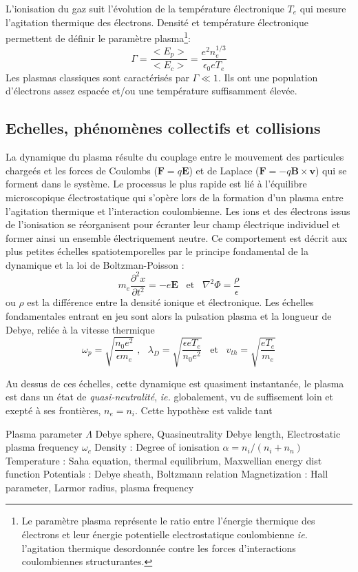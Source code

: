 			L'ionisation du gaz suit l'évolution de la température électronique $T_e$ qui
			mesure l'agitation thermique des électrons. Densité et température
			électronique permettent de définir le paramètre plasma\footnote{Le
			paramètre plasma représente le ratio entre l'énergie thermique des électrons
			et leur énergie potentielle electrostatique coulombienne \emph{ie.}
			l'agitation thermique desordonnée contre les forces d'interactions
			coulombiennes structurantes.}:
				$$\Gamma=\frac{<E_p>}{<E_c>}=\frac{e^2n_e^{1/3}}{\epsilon_0 eT_e}$$
			Les plasmas classiques sont caractérisés par $\Gamma\ll 1$. Ils ont une
			population d'électrons assez espacée et/ou une température suffisamment élevée. 
			
		\subsection{Echelles, phénomènes collectifs et collisions}
		La dynamique du plasma résulte du couplage entre le mouvement des particules chargeés et les forces 
		de Coulombs ($\mathbf F=q\mathbf E$) et de Laplace ($\mathbf F=-q\mathbf
			B\times\mathbf v$) qui se forment dans le système. Le processus le plus rapide est lié à l'équilibre
			microscopique électrostatique qui s'opère lors de la formation d'un plasma entre l'agitation thermique et 
			l'interaction coulombienne. Les ions et des électrons
			issus de l'ionisation se réorganisent pour écranter leur champ
			électrique individuel et former ainsi un ensemble électriquement neutre. 
			Ce comportement est décrit aux plus petites échelles spatiotemporelles par le principe fondamental de 
			la dynamique et la loi de Boltzman-Poisson :
			$$m_e\frac{\partial^2 x}{\partial t^2}=-e\mathbf E \;\;\;\text{et}\;\;\;\nabla^2\Phi=\frac{\rho}{\epsilon}$$ 
			ou $\rho$ est la différence entre la densité ionique et électronique.
			Les échelles fondamentales entrant en jeu sont alors la pulsation plasma et la longueur de Debye, 
			reliée à la vitesse thermique 
			$$\omega_p=\sqrt{\frac{n_0e^2}{\epsilon m_e}}\;\text{,}\;\;\;\lambda_D=\sqrt{\frac{\epsilon eT_e}{n_0e^2}}\;\;\;\text{et}\;\;\;v_{th}=\sqrt{\frac{eT_e}{m_e}}$$
			
			Au dessus de ces échelles, cette dynamique est quasiment instantanée,
			le plasma est dans un état de \emph{quasi-neutralité}, 
			\emph{ie.} globalement, vu de suffisement loin et exepté à ses frontières, $n_e=n_i$. Cette hypothèse 
			est valide tant 
			
		 Plasma parameter $\Lambda$ Debye sphere, Quasineutrality Debye length,
		Electrostatic plasma frequency $\omega_c$
		 Density : Degree of ionisation $\alpha=n_i/(n_i+n_n)$
			Temperature : Saha equation, thermal equilibrium, Maxwellian energy dist function
			Potentials : Debye sheath, Boltzmann relation
			Magnetization : Hall parameter, Larmor radius, plasma frequency
		

